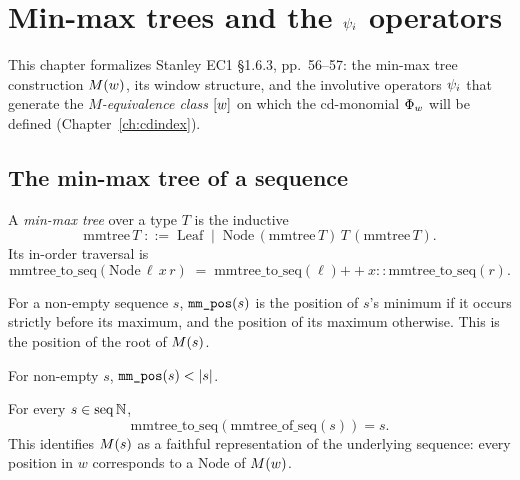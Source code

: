 \chapter{Min-max trees and the $\psi_{i}$ operators}
\label{ch:mmtree}

This chapter formalizes Stanley EC1 \S1.6.3, pp.~56--57: the min-max
tree construction $M(w)$, its window structure, and the
involutive operators $\psi_{i}$ that generate the
\emph{$M$-equivalence class} $[w]$ on which the cd-monomial
$\Phi_{w}$ will be defined (Chapter~\ref{ch:cdindex}).

\section{The min-max tree of a sequence}

\begin{definition}
  \label{def:mmtree}
  \rocqok
  A \emph{min-max tree} over a type $T$ is the inductive
  \[
    \mathrm{mmtree}\,T \;::=\;
      \mathrm{Leaf}
      \;\mid\;
      \mathrm{Node}\,(\mathrm{mmtree}\,T)\,T\,(\mathrm{mmtree}\,T).
  \]
  Its in-order traversal is
  \[
    \mathrm{mmtree\_to\_seq}(\mathrm{Node}\,\ell\,x\,r)
      \;=\;
      \mathrm{mmtree\_to\_seq}(\ell) \mathbin{+\!\!+} x :: \mathrm{mmtree\_to\_seq}(r).
  \]
\end{definition}

\begin{definition}
  \label{def:mm_pos}
  \rocqok
  For a non-empty sequence $s$, $\texttt{mm\_pos}(s)$ is the position of
  $s$'s minimum if it occurs strictly before its maximum, and the
  position of its maximum otherwise.  This is the position of the root
  of $M(s)$.
\end{definition}

\begin{lemma}
  \label{lem:mm_pos_lt}
  \rocqok
  For non-empty $s$, $\texttt{mm\_pos}(s) < |s|$.
\end{lemma}

\begin{theorem}
  \label{thm:mmtree_of_seqK}
  \rocqok
  For every $s \in \mathrm{seq}\,\mathbb{N}$,
  \[
    \mathrm{mmtree\_to\_seq}(\mathrm{mmtree\_of\_seq}(s)) = s.
  \]
  This identifies $M(s)$ as a faithful representation of the
  underlying sequence: every position in $w$ corresponds to a $\mathrm{Node}$
  of $M(w)$.
\end{theorem}

